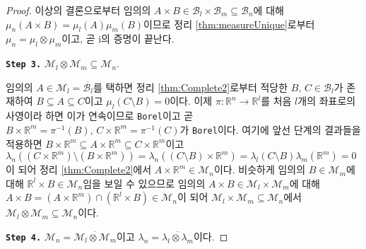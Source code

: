\begin{proof}
    이상의 결론으로부터 임의의 $A\times B\in\mathcal{B}_l\times\mathcal{B}_m\subseteq\mathcal{B}_n$에 대해 $\mu_n(A\times B)=\mu_l(A)\mu_m(B)$이므로 정리 \ref{thm:measureUnique}로부터 $\mu_n=\mu_l\otimes\mu_m$이고, 곧 i의 증명이 끝난다.

    \noindent\texttt{\textbf{Step 3.}} $\mathcal{M}_l\otimes\mathcal{M}_m\subseteq\mathcal{M}_n$.

    임의의 $A\in\mathcal{M}_l=\overline{\mathcal{B}_l}$를 택하면 정리 \ref{thm:Complete2}로부터 적당한 $B,\,C\in\mathcal{B}_l$가 존재하여 $B\subseteq A\subseteq C$이고 $\mu_l(C\setminus B)=0$이다. 이제 $\pi:\mathbb{R}^n\to\mathbb{R}^l$를 처음 $l$개의 좌표로의 사영이라 하면 이가 연속이므로 \texttt{Borel}이고 곧 $B\times\mathbb{R}^m=\pi^{-1}(B),\,C\times\mathbb{R}^m=\pi^{-1}(C)$가 \texttt{Borel}이다. 여기에 앞선 단계의 결과들을 적용하면 $B\times\mathbb{R}^m\subseteq A\times\mathbb{R}^m\subseteq C\times\mathbb{R}^m$이고 $\lambda_n((C\times\mathbb{R}^m)\setminus(B\times\mathbb{R}^m))=\lambda_n((C\setminus B)\times\mathbb{R}^m)=\lambda_l(C\setminus B)\lambda_m(\mathbb{R}^m)=0$이 되어 정리 \ref{thm:Complete2}에서 $A\times\mathbb{R}^m\in\mathcal{M}_n$이다. 비슷하게 임의의 $B\in\mathcal{M}_m$에 대해 $\mathbb{R}^l\times B\in\mathcal{M}_n$임을 보일 수 있으므로 임의의 $A\times B\in\mathcal{M}_l\times\mathcal{M}_m$에 대해 $A\times B=(A\times\mathbb{R}^m)\cap(\mathbb{R}^l\times B)\in\mathcal{M}_n$이 되어 $\mathcal{M}_l\times\mathcal{M}_m\subseteq\mathcal{M}_n$에서 $\mathcal{M}_l\otimes\mathcal{M}_m\subseteq\mathcal{M}_n$이다.

    \noindent\texttt{\textbf{Step 4.}} $\mathcal{M}_n=\overline{\mathcal{M}_l\otimes\mathcal{M}_m}$이고 $\lambda_n=\overline{\lambda_l\otimes\lambda_m}$이다.


\end{proof}
